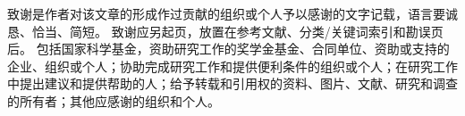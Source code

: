 \begin{acknowledgements}
    致谢是作者对该文章的形成作过贡献的组织或个人予以感谢的文字记载，语言要诚恳、恰当、简短。
    致谢应另起页，放置在参考文献、分类/关键词索引和勘误页后。
    包括国家科学基金，资助研究工作的奖学金基金、合同单位、资助或支持的企业、组织或个人；协助完成研究工作和提供便利条件的组织或个人；在研究工作中提出建议和提供帮助的人；给予转载和引用权的资料、图片、文献、研究和调查的所有者；其他应感谢的组织和个人。
\end{acknowledgements}
